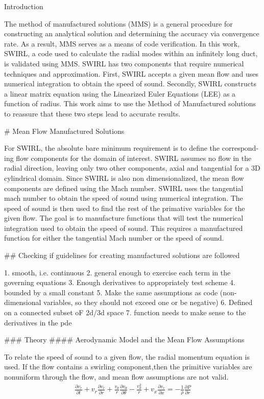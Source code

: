 Introduction

The method of manufactured solutions (MMS) is a general procedure for constructing an analytical solution and determining the accuracy via convergence rate. As a result, MMS serves as a means of code verification. In this work, SWIRL, a code used to calculate the radial modes within an infinitely long duct, is validated using MMS. SWIRL has two components that require numerical techniques and approximation. First, SWIRL accepts a given mean flow and uses numerical integration to obtain the speed of sound.  Secondly, SWIRL constructs a linear matrix equation using the Linearized Euler Equations (LEE) as a function of radius. This work aims to use the Method of Manufactured solutions to reassure that these two steps lead to accurate results.

# Mean Flow Manufactured Solutions

For SWIRL, the absolute bare minimum requirement is to define the correspond-
ing flow components for the domain of interest. SWIRL assumes no flow in the
radial direction, leaving only two other components, axial and tangential for a
3D cylindrical domain. Since SWIRL is also non dimensionalized, the mean flow
components are defined using the Mach number. SWIRL uses the tangential
mach number to obtain the speed of sound using numerical integration. The
speed of sound is then used to find the rest of the primative variables for the
given flow.
The goal is to manufacture functions that will test the numerical integration
used to obtain the speed of sound. This requires a manufactured function for
either the tangential Mach number or the speed of sound.

## Checking if guidelines for creating manufactured solutions are followed

1. smooth, i.e. continuous
2. general enough to exercise each term in the governing equations
3. Enough derivatives to appropriately test scheme
4. bounded by a small constant
5. Make the same assumptions as code (non-dimensional variables, so they
    should not exceed one or be negative)
6. Defined on a connected subset oF 2d/3d space
7. function needs to make sense to the derivatives in the pde


### Theory
#### Aerodynamic Model and the Mean Flow Assumptions

To relate the speed of sound to a given flow, the radial momentum equation
is used.  If the flow contains a swirling component,then the primitive variables 
are nonuniform through the flow, and mean flow assumptions are not valid. 
\begin{align*}
    \frac{\partial v_r}{\partial t} +
    v_r \frac{\partial v_r}{\partial r} + 
    \frac{v_{\theta}}{r} 
    \frac{\partial v_{\theta}}{\partial \theta} -
    \frac{v_{\theta}^2}{r} +
    v_x \frac{\partial v_r}{\partial x} =-
    \frac{1}{\rho}\frac{\partial P}{\partial r}
\end{align*}

